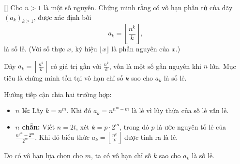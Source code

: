 \documentclass[../05-modular-arithmetic-a.tex]{subfiles}
\begin{document}
\begin{example*}\label{example:IND-2015-TST4-P3}\textbf{[]}
	Cho \( n > 1 \) là một số nguyên. Chứng minh rằng có vô hạn phần tử của dãy \( (a_k)_{k \ge 1} \), được xác định bởi
	\[
		a_k = \left\lfloor \frac{n^k}{k} \right\rfloor,
	\]
	là số lẻ. (Với số thực \( x \), ký hiệu \( \lfloor x \rfloor \) là phần nguyên của \( x \).)
\end{example*}

\begin{story*}
    Dãy \( a_k = \left\lfloor \frac{n^k}{k} \right\rfloor \) có giá trị gần với \( \frac{n^k}{k} \), vốn là một số gần nguyên khi \( n \) lớn.  
    Mục tiêu là chứng minh tồn tại vô hạn chỉ số \( k \) sao cho \( a_k \) là số lẻ.

    Hướng tiếp cận chia hai trường hợp:
    \begin{itemize}[topsep=0pt, partopsep=0pt, itemsep=0pt]
        \item \textbf{\( n \) lẻ:} Lấy \( k = n^m \). Khi đó \( a_k = n^{n^m - m} \) là lẻ vì lũy thừa của số lẻ vẫn lẻ.
        \item \textbf{\( n \) chẵn:} Viết \( n = 2t \), xét \( k = p \cdot 2^m \), trong đó \( p \) là ước nguyên tố lẻ của \( \frac{n^{2^m} - 2^m}{2^m} \). Khi đó biểu thức \( a_k = \left\lfloor \frac{n^k}{k} \right\rfloor \) được tính ra là lẻ.
    \end{itemize}

    Do có vô hạn lựa chọn cho \( m \), ta có vô hạn chỉ số \( k \) sao cho \( a_k \) là số lẻ.
\end{story*}

\bigbreak
\end{document}
